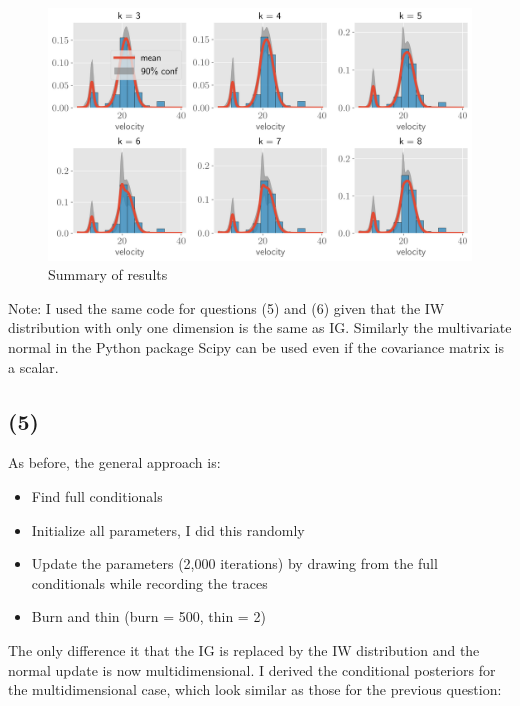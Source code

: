 \documentclass[11pt]{article}
\begin{document}
\begin{figure}[!h]
    \centering
    \includegraphics[scale=.5
    ]{../figures/galaxies.png}
    \caption{Summary of results}
    \label{fig:my_label}
\end{figure}

Note: I used the same code for questions (5) and (6) given that the IW distribution with only one dimension is the same as IG. Similarly the multivariate normal in the Python package Scipy can be used even if the covariance matrix is a scalar.

\subsection*{(5)}
As before, the general approach is:
\begin{itemize}
    \item Find full conditionals
    \item Initialize all parameters, I did this randomly 
    \item Update the parameters (2,000 iterations) by drawing from the full conditionals while recording the traces
    \item Burn and thin (burn = 500, thin = 2)
\end{itemize}

The only difference it that the IG is replaced by the IW distribution and the normal update is now multidimensional. I derived the conditional posteriors for the multidimensional case, which look similar as those for the previous question:
\end{document}
